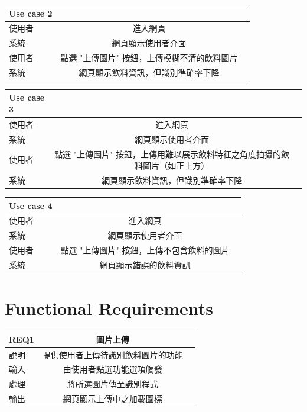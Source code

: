 \documentclass{scrreprt}
\begin{document}
\begin{CJK}{UTF8}{bkai}
\begin{center}
\begin{tabular}{|l|c|r|}\hline
Use case 2 &\\ \hline
使用者 & 進入網頁\\ \hline
系統 & 網頁顯示使用者介面\\ \hline
使用者 & 點選 "上傳圖片" 按鈕，上傳模糊不清的飲料圖片\\ \hline
系統 & 網頁顯示飲料資訊，但識別準確率下降\\ \hline
\end{tabular}
\end{center}

\begin{center}
\begin{tabular}{|l|c|r|}\hline
Use case 3 &\\ \hline
使用者 & 進入網頁\\ \hline
系統 & 網頁顯示使用者介面\\ \hline
使用者 & 點選 "上傳圖片" 按鈕，上傳用難以展示飲料特征之角度拍攝的飲料圖片（如正上方）\\ \hline
系統 & 網頁顯示飲料資訊，但識別準確率下降\\ \hline
\end{tabular}
\end{center}


\begin{center}
\begin{tabular}{|l|c|r|}\hline
Use case 4 &\\ \hline
使用者 & 進入網頁\\ \hline
系統 & 網頁顯示使用者介面\\ \hline
使用者 & 點選 "上傳圖片" 按鈕，上傳不包含飲料的圖片\\ \hline
系統 & 網頁顯示錯誤的飲料資訊\\ \hline
\end{tabular}
\end{center}

\section{Functional Requirements}
\begin{center}
\begin{tabular}{|l|c|r|}\hline
REQ1 & 圖片上傳\\ \hline
說明 & 提供使用者上傳待識別飲料圖片的功能\\ \hline
輸入 & 由使用者點選功能選項觸發\\ \hline
處理 & 將所選圖片傳至識別程式\\ \hline
輸出 & 網頁顯示上傳中之加載圖標\\ \hline
\end{tabular}
\end{center}


\end{CJK}
\end{document}

